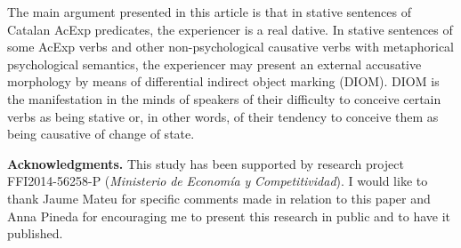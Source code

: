 \documentclass[output=paper,modfonts,nonflat]{langsci/langscibook}
\begin{document}
The main argument presented in this article is that in stative sentences of Catalan AcExp predicates, the experiencer is a real dative. In stative sentences of some AcExp verbs and other non-psychological causative verbs with metaphorical psychological semantics, the experiencer may present an external accusative morphology by means of differential indirect object marking (DIOM). DIOM is the manifestation in the minds of speakers of their difficulty to conceive certain verbs as being stative or, in other words, of their tendency to conceive them as being causative of change of state.

\textbf{Acknowledgments.} This study has been supported by research project FFI2014-56258-P (\textit{Ministerio} \textit{de} \textit{Economía} \textit{y} \textit{Competitividad}). I would like to thank Jaume Mateu for specific comments made in relation to this paper and Anna Pineda for encouraging me to present this research in public and to have it published.
\end{document}
